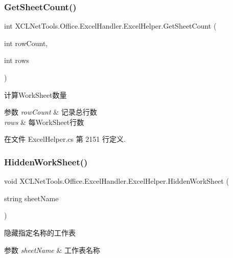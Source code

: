 \subsubsection{\texorpdfstring{Get\+Sheet\+Count()}{GetSheetCount()}}
{\footnotesize\ttfamily int X\+C\+L\+Net\+Tools.\+Office.\+Excel\+Handler.\+Excel\+Helper.\+Get\+Sheet\+Count (\begin{DoxyParamCaption}\item[{int}]{row\+Count,  }\item[{int}]{rows }\end{DoxyParamCaption})}



计算\+Work\+Sheet数量 


\begin{DoxyParams}{参数}
{\em row\+Count} & 记录总行数\\
\hline
{\em rows} & 每\+Work\+Sheet行数\\
\hline
\end{DoxyParams}


在文件 Excel\+Helper.\+cs 第 2151 行定义.

\mbox{\label{class_x_c_l_net_tools_1_1_office_1_1_excel_handler_1_1_excel_helper_a9aaab80ccb46c62132165fd20790e3d0}} 
\subsubsection{\texorpdfstring{Hidden\+Work\+Sheet()}{HiddenWorkSheet()}\hspace{0.1cm}{\footnotesize\ttfamily [1/2]}}
{\footnotesize\ttfamily void X\+C\+L\+Net\+Tools.\+Office.\+Excel\+Handler.\+Excel\+Helper.\+Hidden\+Work\+Sheet (\begin{DoxyParamCaption}\item[{string}]{sheet\+Name }\end{DoxyParamCaption})}



隐藏指定名称的工作表 


\begin{DoxyParams}{参数}
{\em sheet\+Name} & 工作表名称\\
\hline
\end{DoxyParams}


